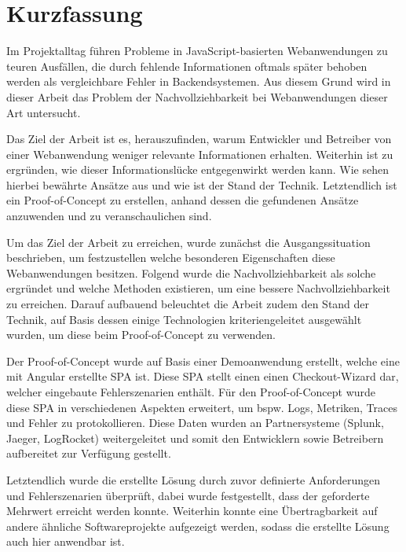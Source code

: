 \section*{\thispagestyle{empty}Kurzfassung}
	
Im Projektalltag führen Probleme in JavaScript-basierten Webanwendungen zu teuren Ausfällen, die durch fehlende Informationen oftmals später behoben werden als vergleichbare Fehler in Backendsystemen. Aus diesem Grund wird in dieser Arbeit das Problem der Nachvollziehbarkeit bei Webanwendungen dieser Art untersucht.
	
Das Ziel der Arbeit ist es, herauszufinden, warum Entwickler und Betreiber von einer Webanwendung weniger relevante Informationen erhalten. Weiterhin ist zu ergründen, wie dieser Informationslücke entgegenwirkt werden kann. Wie sehen hierbei bewährte Ansätze aus und wie ist der Stand der Technik. Letztendlich ist ein Proof-of-Concept zu erstellen, anhand dessen die gefundenen Ansätze anzuwenden und zu veranschaulichen sind.

Um das Ziel der Arbeit zu erreichen, wurde zunächst die Ausgangssituation beschrieben, um festzustellen welche besonderen Eigenschaften diese Webanwendungen besitzen. Folgend wurde die Nachvollziehbarkeit als solche ergründet und welche Methoden existieren, um eine bessere Nachvollziehbarkeit zu erreichen. Darauf aufbauend beleuchtet die Arbeit zudem den Stand der Technik, auf Basis dessen einige Technologien kriteriengeleitet ausgewählt wurden, um diese beim Proof-of-Concept zu verwenden.

Der Proof-of-Concept wurde auf Basis einer Demoanwendung erstellt, welche eine mit Angular erstellte SPA ist. Diese SPA stellt einen einen Checkout-Wizard dar, welcher eingebaute Fehlerszenarien enthält. Für den Proof-of-Concept wurde diese SPA in verschiedenen Aspekten erweitert, um bspw. Logs, Metriken, Traces und Fehler zu protokollieren. Diese Daten wurden an Partnersysteme (Splunk, Jaeger, LogRocket) weitergeleitet und somit den Entwicklern sowie Betreibern aufbereitet zur Verfügung gestellt.

Letztendlich wurde die erstellte Lösung durch zuvor definierte Anforderungen und Fehlerszenarien überprüft, dabei wurde festgestellt, dass der geforderte Mehrwert erreicht werden konnte. Weiterhin konnte eine Übertragbarkeit auf andere ähnliche Softwareprojekte aufgezeigt werden, sodass die erstellte Lösung auch hier anwendbar ist.

